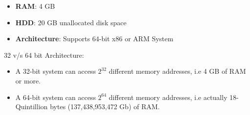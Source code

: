 \setlength{\columnsep}{3pt}
\begin{flushleft}

\bigskip

\begin{itemize}

	\item \textbf{RAM}: 4 GB
	\item \textbf{HDD}:	20 GB unallocated disk space
	\item \textbf{Architecture}: Supports 64-bit x86 or ARM System
	
\end{itemize}
 
 \begin{tcolorbox}[breakable,notitle,boxrule=-0pt,colback=yellow,colframe=yellow]
 	\color{black}
 	32 v/s 64 bit Architecture:
 	\begin{itemize}
 		\item A 32-bit system can access $2^{32}$ different memory addresses, i.e 4 GB of RAM or more. 
 		\item A 64-bit system can access $2^{64}$ different memory addresses, i.e actually 18-Quintillion bytes (137,438,953,472 Gb) of RAM.
 	\end{itemize}  
 	
 \end{tcolorbox}
 
 
 

\end{flushleft}
\newpage



